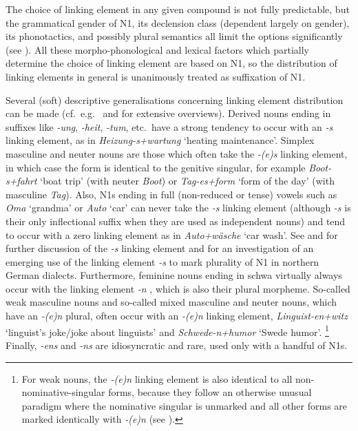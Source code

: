 The choice of linking element in any given compound is not fully predictable, but the grammatical gender of N1, its declension class (dependent largely on gender), its phonotactics, and possibly plural semantics all limit the options significantly (see \citealt{Fuhrhop1996,NueblingSzczepaniak2013}).
All these morpho-phono\-logical and lexical factors which partially determine the choice of linking element are based on N1, so the distribution of linking elements in general is unanimously treated as suffixation of N1.

Several (soft) descriptive generalisations concerning linking element distribution can be made (cf.\ e.g.\ \citealt{Fuhrhop1996} and \citealt{NueblingSzczepaniak2013} for extensive overviews).
Derived nouns ending in suffixes like \textit{-ung}, \textit{-heit}, \textit{-tum}, etc.\ have a strong tendency to occur with an \textit{-s} linking element, as in \textit{Heizung-s+wartung} `heating maintenance'.
Simplex masculine and neuter nouns are those which often take the \textit{-(e)s} linking element, in which case the form is identical to the genitive singular, for example \textit{Boot-s+fahrt} `boat trip' (with neuter \textit{Boot}) or \textit{Tag-es+form} `form of the day' (with masculine \textit{Tag}).
Also, N1s ending in full (non-reduced or tense) vowels such as \textit{Oma} `grandma' or \textit{Auto} `car' can never take the \textit{-s} linking element (although \textit{-s} is their only inflectional suffix when they are used as independent nouns) and tend to occur with a zero linking element as in \textit{Auto+wäsche} `car wash'.
See \textcite{Wegener2003, Wegener2005} and \textcite{FuhrhopKuerschner2015} for further discussion of the \textit{-s} linking element and \textcite{Fehringer2009} for an investigation of an emerging use of the linking element \textit{-s} to mark plurality of N1 in northern German dialects.
Furthermore, feminine nouns ending in schwa virtually always occur with the linking element \textit{-n} \parencite[32]{LibbenEa2002}, which is also their plural morpheme.
So-called weak masculine nouns and so-called mixed masculine and neuter nouns, which have an \textit{-(e)n} plural, often occur with an \textit{-(e)n} linking element, \egg \textit{Linguist-en+witz} `linguist's joke\slash joke about linguists' and \textit{Schwede-n+humor} `Swede humor'.%
\footnote{For weak nouns, the \textit{-(e)n} linking element is also identical to all non-nominative-singular forms, because they follow an otherwise unusual paradigm where the nominative singular is unmarked and all other forms are marked identically with \textit{-(e)n} (see \citealt{Koepcke1995,Schaefer2016c}).}
Finally, \textit{-ens} and \textit{-ns} are idiosyncratic and rare, used only with a handful of N1s.


